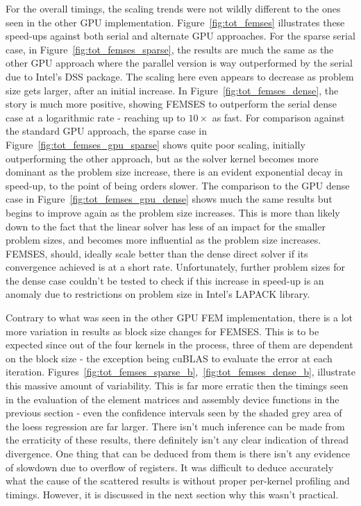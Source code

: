 For the overall timings, the scaling trends were not wildly different to the ones seen in the other GPU implementation. Figure~\ref{fig:tot_femses} illustrates these speed-ups against both serial and alternate GPU approaches. For the sparse serial case, in Figure~\ref{fig:tot_femses_sparse}, the results are much the same as the other GPU approach where the parallel version is way outperformed by the serial due to Intel's DSS package. The scaling here even appears to decrease as problem size gets larger, after an initial increase. In Figure~\ref{fig:tot_femses_dense}, the story is much more positive, showing FEMSES to outperform the serial dense case at a logarithmic rate - reaching up to $10\times$ as fast. For comparison against the standard GPU approach, the sparse case in Figure~\ref{fig:tot_femses_gpu_sparse} shows quite poor scaling, initially outperforming the other approach, but as the solver kernel becomes more dominant as the problem size increase, there is an evident exponential decay in speed-up, to the point of being orders slower. The comparison to the GPU dense case in Figure~\ref{fig:tot_femses_gpu_dense} shows much the same results but begins to improve again as the problem size increases. This is more than likely down to the fact that the linear solver has less of an impact for the smaller problem sizes, and becomes more influential as the problem size increases. FEMSES, should, ideally scale better than the dense direct solver if its convergence achieved is at a short rate. Unfortunately, further problem sizes for the dense case couldn't be tested to check if this increase in speed-up is an anomaly due to restrictions on problem size in Intel's LAPACK library.

Contrary to what was seen in the other GPU FEM implementation, there is a lot more variation in results as block size changes for FEMSES. This is to be expected since out of the four kernels in the process, three of them are dependent on the block size - the exception being cuBLAS to evaluate the error at each iteration. Figures~\ref{fig:tot_femses_sparse_b},~\ref{fig:tot_femses_dense_b}, illustrate this massive amount of variability. This is far more erratic then the timings seen in the evaluation of the element matrices and assembly device functions in the previous section - even the confidence intervals seen by the shaded grey area of the loess regression are far larger. There isn't much inference can be made from the erraticity of these results, there definitely isn't any clear indication of thread divergence. One thing that can be deduced from them is there isn't any evidence of slowdown due to overflow of registers. It was difficult to deduce accurately what the cause of the scattered results is without proper per-kernel profiling and timings. However, it is discussed in the next section why this wasn't practical.

